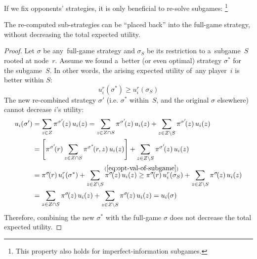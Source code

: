 If we fix opponents' strategies, it is only beneficial to re-solve subgames:%
\footnote{This property also holds for imperfect-information subgames.}
\begin{thm}
  \label{thm:perf-info-subgames-utility}
  The re-computed sub-strategies can be ``placed back'' into the full-game strategy, without decreasing the total expected utility.
\end{thm}
\begin{proof}
  Let $\sigma$ be any~full-game strategy and $\sigma_S$ be its restriction to a~subgame~$S$ rooted at node~$r$.
  Assume we found a~better (or even optimal) strategy $\sigma^*$ for the subgame~$S$.
  In other words, the arising expected utility of~any player~$i$ is better within $S$:
  \begin{equation}
    \label{eq:opt-val-of-subgame}
    u_i^r(\sigma^*) \ge u_i^r(\sigma_S)
  \end{equation}
  The new re-combined strategy $\sigma'$ (i.e. $\sigma^*$ within~$S$, and the original $\sigma$ elsewhere) cannot decrease $i$'s utility:
  \begin{align*}
    u_i(\sigma')
    &= \sum _{z \in Z} \pi^{\sigma'}\!(z) \,u_i(z)
    = \sum _{z \in Z \cap S} \pi^{\sigma'}\!(z) \,u_i(z)
    + \sum _{z \in Z \setminus S} \pi^{\sigma'}\!(z) \,u_i(z) \\
    &= \left[ \pi^{\sigma'}\!(r)\sum _{z \in Z \cap S} \pi^{\sigma^*}\!(r, z) \,u_i(z) \right]
    + \sum _{z \in Z \setminus S} \pi^{\sigma'}\!(z) \,u_i(z) \\
    &= \pi^{\sigma}\!(r) \,u_i^r(\sigma^*)
    + \sum _{z \in Z \setminus S} \pi^{\sigma}\!(z) \,u_i(z)
    \stackrel{\mathclap{\mathrm{(\ref{eq:opt-val-of-subgame})}}} {\ge}
    \pi^{\sigma}\!(r) \,u_i^r(\sigma_S)
    + \sum _{z \in Z \setminus S} \pi^{\sigma}\!(z) \,u_i(z) \\
    &= \sum _{z \in Z \cap S} \pi^{\sigma}\!(z) \,u_i(z)
    + \sum _{z \in Z \setminus S} \pi^{\sigma}\!(z) \,u_i(z)
    = u_i(\sigma)
  \end{align*}
  Therefore, combining the new $\sigma^*$ with the full-game $\sigma$ does not decrease the total expected utility.
\end{proof}

